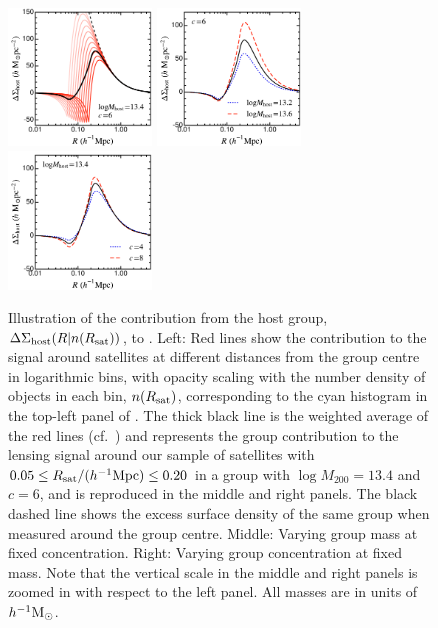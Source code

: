 \begin{figure}[h]
 \centerline{\includegraphics[width=1.5in]{chapter5/ESDhost_bin1_showbins.pdf}
             \includegraphics[width=1.5in]{chapter5/ESDhost_bin1_cfix.pdf}
             \includegraphics[width=1.5in]{chapter5/ESDhost_bin1_mfix.pdf}}
\caption{Illustration of the contribution from the host group, $\Delta\Sigma_{\rm host}(R\vert 
n(R_{\rm sat}))$, to .
Left: Red lines show the contribution to the signal around satellites at different 
distances from the group centre in logarithmic bins, with opacity scaling with the number density 
of objects in each bin, $n(R_{\rm sat})$, corresponding to the cyan histogram in the top-left panel of 
. The thick black line is the weighted average of the red lines 
(cf.\ ) and represents the group contribution to the lensing signal around our 
sample of satellites with $0.05\leq R_{\rm sat}/(h^{-1}{\rm Mpc})\leq0.20$ in a group with $\log 
M_{200}=13.4$ and $c=6$, and is reproduced in the middle and right panels. The black dashed line 
shows the excess surface density of the same group when measured around the group centre.
Middle: Varying group mass at fixed concentration.
Right: Varying group concentration at fixed mass.
Note that the vertical scale in the middle and right panels is zoomed in with respect to the left 
panel. All masses are in units of $h^{-1}{\rm M}_\odot$.
}
\label{f:illustration_group}
\end{figure}

